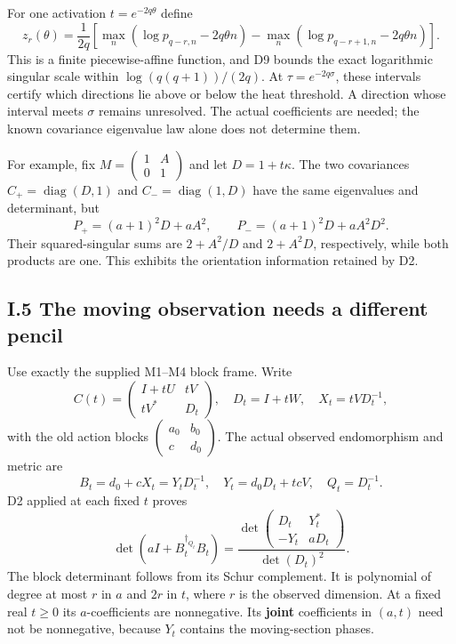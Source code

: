 For one activation \(t=e^{-2q\theta}\) define \[
 z_r(\theta)=\frac1{2q}
 \left[\max_n(\log p_{q-r,n}-2q\theta n)
       -\max_n(\log p_{q-r+1,n}-2q\theta n)\right].
\] This is a finite piecewise-affine function, and D9 bounds the exact logarithmic singular scale within \(\log(q(q+1))/(2q)\). At \(\tau=e^{-2q\sigma}\), these intervals certify which directions lie above or below the heat threshold. A direction whose interval meets \(\sigma\) remains unresolved. The actual coefficients are needed; the known covariance eigenvalue law alone does not determine them.

For example, fix \(M=\left(\begin{smallmatrix}1&A\\0&1\end{smallmatrix}\right)\) and let \(D=1+t\kappa\). The two covariances \(C_+=\operatorname{diag}(D,1)\) and \(C_-=\operatorname{diag}(1,D)\) have the same eigenvalues and determinant, but \[
 P_+=(a+1)^2D+aA^2,\qquad
 P_-=(a+1)^2D+aA^2D^2.
 \tag{D12}
\] Their squared-singular sums are \(2+A^2/D\) and \(2+A^2D\), respectively, while both products are one. This exhibits the orientation information retained by D2.

\subsection{I.5 The moving observation needs a different pencil}\label{i.5-the-moving-observation-needs-a-different-pencil}

Use exactly the supplied M1--M4 block frame. Write \[
 C(t)=\begin{pmatrix}I+tU&tV\\tV^*&D_t\end{pmatrix},\quad D_t=I+tW,
\quad X_t=tVD_t^{-1},
\] with the old action blocks \(\left(\begin{smallmatrix}a_0&b_0\\c&d_0\end{smallmatrix}\right)\). The actual observed endomorphism and metric are \[
 B_t=d_0+cX_t=Y_tD_t^{-1},\quad
 Y_t=d_0D_t+t cV,\quad Q_t=D_t^{-1}.
\] D2 applied at each fixed \(t\) proves \[
 \boxed{\det(aI+B_t^{\dagger_{Q_t}}B_t)
 =\frac{\det\begin{pmatrix}D_t&Y_t^*\\-Y_t&aD_t\end{pmatrix}}
              {\det(D_t)^2}.}
 \tag{D13}
\] The block determinant follows from its Schur complement. It is polynomial of degree at most \(r\) in \(a\) and \(2r\) in \(t\), where \(r\) is the observed dimension. At a fixed real \(t\ge0\) its \(a\)-coefficients are nonnegative. Its \textbf{joint} coefficients in \((a,t)\) need not be nonnegative, because \(Y_t\) contains the moving-section phases.

